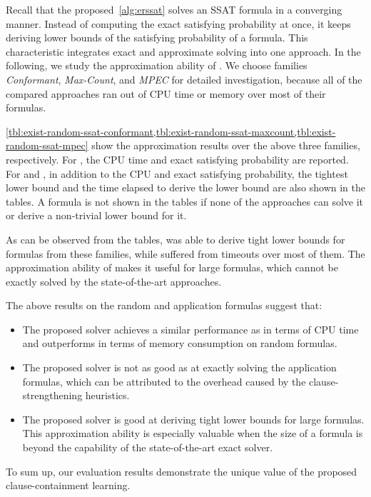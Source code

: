 Recall that the proposed~\cref{alg:erssat} solves an SSAT formula in a converging manner.
Instead of computing the exact satisfying probability at once,
it keeps deriving lower bounds of the satisfying probability of a formula.
This characteristic integrates exact and approximate solving into one approach.
In the following, we study the approximation ability of \erssat.
We choose families \textit{Conformant}, \textit{Max-Count}, and \textit{MPEC} for detailed investigation,
because all of the compared approaches ran out of CPU time or memory over most of their formulas.

\cref{tbl:exist-random-ssat-conformant,tbl:exist-random-ssat-maxcount,tbl:exist-random-ssat-mpec}
show the approximation results over the above three families, respectively.
For \dcssat, the CPU time and exact satisfying probability are reported.
For \erssat and \erssatb, in addition to the CPU and exact satisfying probability,
the tightest lower bound and the time elapsed to derive the lower bound are also shown in the tables.
A formula is not shown in the tables
if none of the approaches can solve it or derive a non-trivial lower bound for it.

As can be observed from the tables,
\erssat was able to derive tight lower bounds for formulas from these families,
while \dcssat suffered from timeouts over most of them.
The approximation ability of \erssat makes it useful for large formulas,
which cannot be exactly solved by the state-of-the-art approaches.

The above results on the random and application formulas suggest that:
\begin{itemize}
    \item The proposed solver \erssat achieves a similar performance as \dcssat in terms of CPU time and outperforms \dcssat in terms of memory consumption on random formulas.
    \item The proposed solver \erssat is not as good as \dcssat at exactly solving the application formulas, which can be attributed to the overhead caused by the clause-strengthening heuristics.
    \item The proposed solver \erssat is good at deriving tight lower bounds for large formulas. This approximation ability is especially valuable when the size of a formula is beyond the capability of the state-of-the-art exact solver.
\end{itemize}
To sum up, our evaluation results demonstrate the unique value of the proposed clause-containment learning.